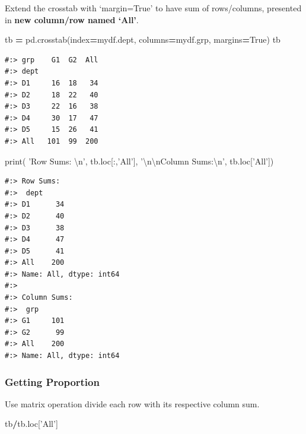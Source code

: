 \documentclass[
]{book}
\newenvironment{Shaded}{\begin{snugshade}}{\end{snugshade}}
\newcommand{\BuiltInTok}[1]{#1}
\newcommand{\CharTok}[1]{\textcolor[rgb]{0.5,0.5,0.5}{#1}}
\newcommand{\NormalTok}[1]{#1}
\newcommand{\OperatorTok}[1]{\textcolor[rgb]{0.43,0.43,0.43}{\textbf{#1}}}
\newcommand{\StringTok}[1]{\textcolor[rgb]{0.5,0.5,0.5}{#1}}
\newcommand{\VariableTok}[1]{\textcolor[rgb]{0,0,0}{#1}}
\begin{document}
Extend the crosstab with `margin=True' to have sum of rows/columns, presented in \textbf{new column/row named `All'}.

\begin{Shaded}
\begin{Highlighting}[]
\NormalTok{tb }\OperatorTok{=}\NormalTok{ pd.crosstab(index}\OperatorTok{=}\NormalTok{mydf.dept, columns}\OperatorTok{=}\NormalTok{mydf.grp, margins}\OperatorTok{=}\VariableTok{True}\NormalTok{)}
\NormalTok{tb}
\end{Highlighting}
\end{Shaded}

\begin{verbatim}
#:> grp    G1  G2  All
#:> dept              
#:> D1     16  18   34
#:> D2     18  22   40
#:> D3     22  16   38
#:> D4     30  17   47
#:> D5     15  26   41
#:> All   101  99  200
\end{verbatim}

\begin{Shaded}
\begin{Highlighting}[]
\BuiltInTok{print}\NormalTok{(}
  \StringTok{'Row Sums:     }\CharTok{\textbackslash{}n}\StringTok{'}\NormalTok{, tb.loc[:,}\StringTok{'All'}\NormalTok{],}
  \StringTok{'}\CharTok{\textbackslash{}n\textbackslash{}n}\StringTok{Column Sums:}\CharTok{\textbackslash{}n}\StringTok{'}\NormalTok{, tb.loc[}\StringTok{'All'}\NormalTok{])}
\end{Highlighting}
\end{Shaded}

\begin{verbatim}
#:> Row Sums:     
#:>  dept
#:> D1      34
#:> D2      40
#:> D3      38
#:> D4      47
#:> D5      41
#:> All    200
#:> Name: All, dtype: int64 
#:> 
#:> Column Sums:
#:>  grp
#:> G1     101
#:> G2      99
#:> All    200
#:> Name: All, dtype: int64
\end{verbatim}

\hypertarget{getting-proportion}{%
\subsubsection{Getting Proportion}\label{getting-proportion}}

Use matrix operation divide each row with its respective column sum.

\begin{Shaded}
\begin{Highlighting}[]
\NormalTok{tb}\OperatorTok{/}\NormalTok{tb.loc[}\StringTok{'All'}\NormalTok{]}
\end{Highlighting}
\end{Shaded}
\end{document}
